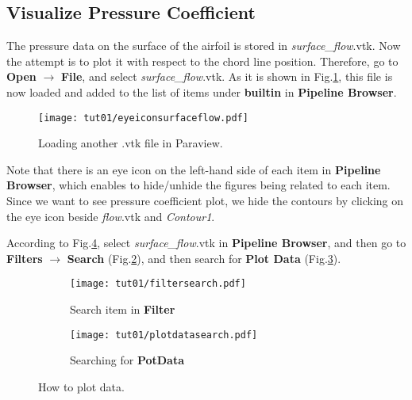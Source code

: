 \subsection{Visualize Pressure Coefficient}
The pressure data on the surface of the airfoil is stored in \textit{surface\_flow}.vtk. Now the attempt is to plot it with respect to the chord line position. Therefore, go to \textbf{Open} $\rightarrow$ \textbf{File}, and select \textit{surface\_flow}.vtk. As it is shown in Fig.\ref{fig1:builtin}, this file is now loaded and added to the list of items under \textbf{builtin} in \textbf{Pipeline Browser}.
\begin{figure}[htbp]
    \centering
    \texttt{[image: tut01/eyeiconsurfaceflow.pdf]}
    \caption{Loading another .vtk file in Paraview.}
    \label{fig1:builtin}
\end{figure}
Note that there is an eye icon on the left-hand side of each item in \textbf{Pipeline Browser}, which enables to hide/unhide the figures being related to each item. Since we want to see pressure coefficient plot, we hide the contours by clicking on the eye icon beside \textit{flow}.vtk and \textit{Contour1}. 

According to Fig.\ref{fig1:plotdata}, select \textit{surface\_flow}.vtk in \textbf{Pipeline Browser}, and then go to \textbf{Filters} $\rightarrow$ \textbf{Search} (Fig.\ref{fig1:plotdata a}), and then search for \textbf{Plot Data} (Fig.\ref{fig1:plotdata b}). 
\begin{figure}[htbp]
    \centering
     \begin{subfigure}[b]{.4\textwidth}
         \centering
         \texttt{[image: tut01/filtersearch.pdf]}
         \caption{Search item in \textbf{Filter}}
         \label{fig1:plotdata a}
     \end{subfigure}
     \hfill
     \begin{subfigure}[b]{.4\textwidth}
         \centering
         \texttt{[image: tut01/plotdatasearch.pdf]}
         \caption{Searching for \textbf{PotData}}
         \label{fig1:plotdata b}
     \end{subfigure}     
    \caption{How to plot data.}
    \label{fig1:plotdata}
\end{figure}

